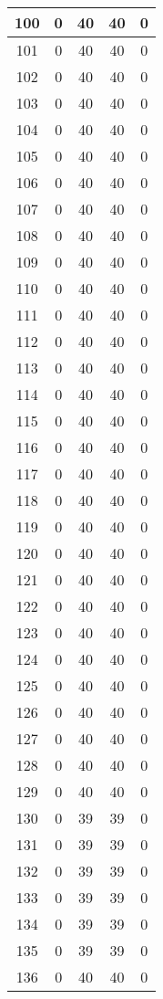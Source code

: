 \documentclass[letterpaper, 12pt]{article}
\begin{document}
\begin{longtable}{|c|c|c|c|c|}
\hline
100 & 0 & 40 & 40 & 0 \\
\hline
101 & 0 & 40 & 40 & 0 \\
\hline
102 & 0 & 40 & 40 & 0 \\
\hline
103 & 0 & 40 & 40 & 0 \\
\hline
104 & 0 & 40 & 40 & 0 \\
\hline
105 & 0 & 40 & 40 & 0 \\
\hline
106 & 0 & 40 & 40 & 0 \\
\hline
107 & 0 & 40 & 40 & 0 \\
\hline
108 & 0 & 40 & 40 & 0 \\
\hline
109 & 0 & 40 & 40 & 0 \\
\hline
110 & 0 & 40 & 40 & 0 \\
\hline
111 & 0 & 40 & 40 & 0 \\
\hline
112 & 0 & 40 & 40 & 0 \\
\hline
113 & 0 & 40 & 40 & 0 \\
\hline
114 & 0 & 40 & 40 & 0 \\
\hline
115 & 0 & 40 & 40 & 0 \\
\hline
116 & 0 & 40 & 40 & 0 \\
\hline
117 & 0 & 40 & 40 & 0 \\
\hline
118 & 0 & 40 & 40 & 0 \\
\hline
119 & 0 & 40 & 40 & 0 \\
\hline
120 & 0 & 40 & 40 & 0 \\
\hline
121 & 0 & 40 & 40 & 0 \\
\hline
122 & 0 & 40 & 40 & 0 \\
\hline
123 & 0 & 40 & 40 & 0 \\
\hline
124 & 0 & 40 & 40 & 0 \\
\hline
125 & 0 & 40 & 40 & 0 \\
\hline
126 & 0 & 40 & 40 & 0 \\
\hline
127 & 0 & 40 & 40 & 0 \\
\hline
128 & 0 & 40 & 40 & 0 \\
\hline
129 & 0 & 40 & 40 & 0 \\
\hline
130 & 0 & 39 & 39 & 0 \\
\hline
131 & 0 & 39 & 39 & 0 \\
\hline
132 & 0 & 39 & 39 & 0 \\
\hline
133 & 0 & 39 & 39 & 0 \\
\hline
134 & 0 & 39 & 39 & 0 \\
\hline
135 & 0 & 39 & 39 & 0 \\
\hline
136 & 0 & 40 & 40 & 0 \\

\end{longtable}
\end{document}
